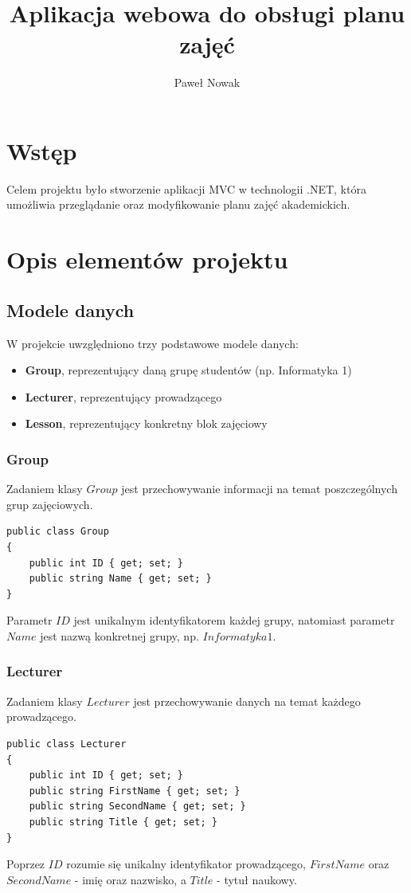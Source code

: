 \documentclass[]{article}
\title{Aplikacja webowa do obsługi planu zajęć}
\author{Paweł Nowak}
\begin{document}
\maketitle
\tableofcontents

\newpage
\section*{Wstęp}
Celem projektu było stworzenie aplikacji MVC w technologii .NET, która umożliwia przeglądanie oraz modyfikowanie planu zajęć akademickich. 

\section{Opis elementów projektu}
\subsection{Modele danych}
W projekcie uwzględniono trzy podstawowe modele danych:
\begin{itemize}
	\item \textbf{Group}, reprezentujący daną grupę studentów (np. Informatyka 1)
	\item \textbf{Lecturer}, reprezentujący prowadzącego
	\item \textbf{Lesson}, reprezentujący konkretny blok zajęciowy
\end{itemize}

\subsubsection{Group}
Zadaniem klasy $Group$ jest przechowywanie informacji na temat poszczególnych grup zajęciowych.
\begin{lstlisting}
public class Group
{
    public int ID { get; set; }
    public string Name { get; set; }
}
\end{lstlisting}
Parametr $ID$ jest unikalnym identyfikatorem każdej grupy, natomiast parametr $Name$ jest nazwą konkretnej grupy, np. $Informatyka 1$.

\subsubsection{Lecturer}
Zadaniem klasy $Lecturer$ jest przechowywanie danych na temat każdego prowadzącego.
\begin{lstlisting}
public class Lecturer
{
    public int ID { get; set; }
    public string FirstName { get; set; }
    public string SecondName { get; set; }
    public string Title { get; set; }
}
\end{lstlisting}
Poprzez $ID$ rozumie się unikalny identyfikator prowadzącego, $FirstName$ oraz $SecondName$ - imię oraz nazwisko, a $Title$ - tytuł naukowy.
\end{document}
